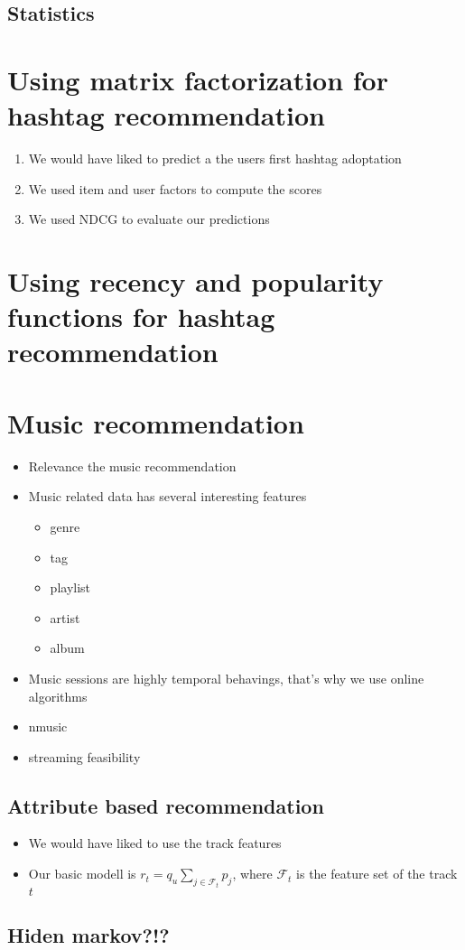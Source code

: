 \subsection{Statistics}

\section{Using matrix factorization for hashtag recommendation}
\begin{enumerate}
\item We would have liked to predict a the users first hashtag adoptation
\item We used item and user factors to compute the scores
\item We used NDCG to evaluate our predictions 
\end{enumerate}


\section{Using recency and popularity functions for hashtag recommendation}

\section{Music recommendation}

\begin{itemize}
\item Relevance the music recommendation
\item Music related data has several interesting features
  \begin{itemize}
  \item genre
  \item tag
  \item playlist
  \item artist
  \item album
  \end{itemize}
\item Music sessions are highly temporal behavings, that's why we use online
  algorithms
\item nmusic
\item streaming feasibility
\end{itemize}

\subsection{Attribute based recommendation}
\begin{itemize}
\item We would have liked to use the track features
\item Our basic modell is $r_t = q_u \sum_{j\in\mathcal{F}_t}p_j$,
  where $\mathcal{F}_t$ is the feature set of the track $t$
\end{itemize}

\subsection{Hiden markov?!?}

